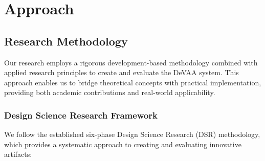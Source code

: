 \chapter{Approach}
\label{chap:approach}

\section{Research Methodology}

Our research employs a rigorous development-based methodology combined with applied research principles to create and evaluate the DeVAA system. This approach enables us to bridge theoretical concepts with practical implementation, providing both academic contributions and real-world applicability.

\subsection{Design Science Research Framework}

We follow the established six-phase Design Science Research (DSR) methodology, which provides a systematic approach to creating and evaluating innovative artifacts:

